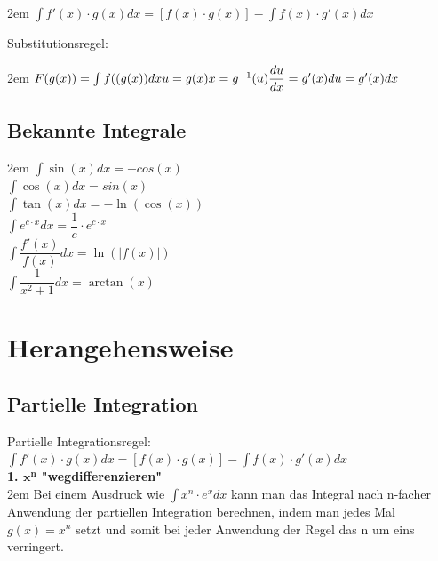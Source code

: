 \documentclass[11pt,final]{scrreprt}
\newcommand{\br} {\medskip\\}
\begin{document}
\begingroup
\leftskip2em 
$ \int f'(x)\cdot g(x) dx = [f(x)\cdot g(x)]-\int f(x)\cdot g'(x) dx $\\
\par	
\endgroup 

Substitutionsregel:

\begingroup
\leftskip2em 
$ F(g(x)) = \int f((g(x)) dx \\
u=g(x)\\
x=g^{-1}(u)\\
\dfrac{du}{dx} =g'(x)\\
du=g'(x)dx\\ $
\par	
\endgroup 

\subsection*{Bekannte Integrale}

\begingroup
\leftskip2em 
$ \int\sin(x) dx = -cos(x) $\\
$ \int\cos(x) dx = sin(x) $\\
$ \int\tan(x) dx = -\ln(\cos(x)) $\\
$ \int e^{c \cdot x} dx = \dfrac{1}{c} \cdot e^{c\cdot x}$\\
$ \int \dfrac{f'(x)}{f(x)} dx = \ln(|f(x)|) $\\
$ \int \dfrac{1}{x^2+1} dx = \arctan(x) $\\
\par	
\endgroup 

\section{Herangehensweise}
\subsection{Partielle Integration}
Partielle Integrationsregel:\\
$ \int f'(x)\cdot g(x) dx = [f(x)\cdot g(x)]-\int f(x)\cdot g'(x) dx $\br

\textbf{1. $\textbf{x}^\textbf{n}$ "wegdifferenzieren"}\\

\begingroup
\leftskip2em 
Bei einem Ausdruck wie $\int x^n\cdot e^x dx$ kann man das Integral nach n-facher Anwendung der partiellen Integration berechnen, indem man jedes Mal $g(x) = x^n$ setzt und somit bei jeder Anwendung der Regel das n um eins verringert.\\
\par	
\endgroup 
\end{document}
